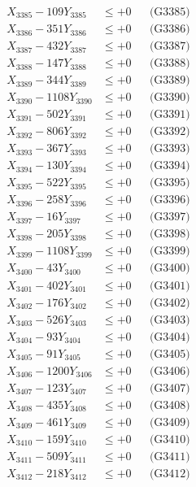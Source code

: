 \documentclass[a4paper,10pt]{article}
\begin{document}
{\begin{align}
X_{3385} - 109Y_{3385} &\leq +0 && \text{(G3385)} \\
X_{3386} - 351Y_{3386} &\leq +0 && \text{(G3386)} \\
X_{3387} - 432Y_{3387} &\leq +0 && \text{(G3387)} \\
X_{3388} - 147Y_{3388} &\leq +0 && \text{(G3388)} \\
X_{3389} - 344Y_{3389} &\leq +0 && \text{(G3389)} \\
X_{3390} - 1108Y_{3390} &\leq +0 && \text{(G3390)} \\
\allowbreak
X_{3391} - 502Y_{3391} &\leq +0 && \text{(G3391)} \\
X_{3392} - 806Y_{3392} &\leq +0 && \text{(G3392)} \\
X_{3393} - 367Y_{3393} &\leq +0 && \text{(G3393)} \\
X_{3394} - 130Y_{3394} &\leq +0 && \text{(G3394)} \\
X_{3395} - 522Y_{3395} &\leq +0 && \text{(G3395)} \\
X_{3396} - 258Y_{3396} &\leq +0 && \text{(G3396)} \\
X_{3397} - 16Y_{3397} &\leq +0 && \text{(G3397)} \\
X_{3398} - 205Y_{3398} &\leq +0 && \text{(G3398)} \\
X_{3399} - 1108Y_{3399} &\leq +0 && \text{(G3399)} \\
X_{3400} - 43Y_{3400} &\leq +0 && \text{(G3400)} \\
\allowbreak
X_{3401} - 402Y_{3401} &\leq +0 && \text{(G3401)} \\
X_{3402} - 176Y_{3402} &\leq +0 && \text{(G3402)} \\
X_{3403} - 526Y_{3403} &\leq +0 && \text{(G3403)} \\
X_{3404} - 93Y_{3404} &\leq +0 && \text{(G3404)} \\
X_{3405} - 91Y_{3405} &\leq +0 && \text{(G3405)} \\
X_{3406} - 1200Y_{3406} &\leq +0 && \text{(G3406)} \\
X_{3407} - 123Y_{3407} &\leq +0 && \text{(G3407)} \\
X_{3408} - 435Y_{3408} &\leq +0 && \text{(G3408)} \\
X_{3409} - 461Y_{3409} &\leq +0 && \text{(G3409)} \\
X_{3410} - 159Y_{3410} &\leq +0 && \text{(G3410)} \\
\allowbreak
X_{3411} - 509Y_{3411} &\leq +0 && \text{(G3411)} \\
X_{3412} - 218Y_{3412} &\leq +0 && \text{(G3412)} \\

\end{align}}
\end{document}
